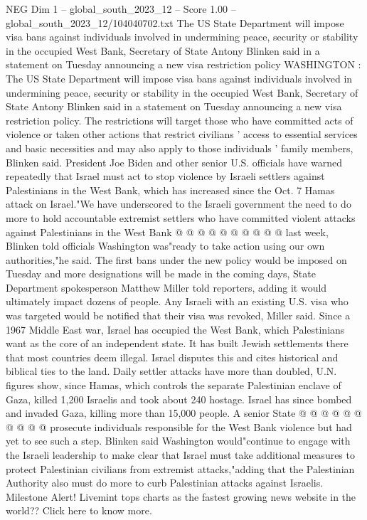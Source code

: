 \begin{textsample}{NEG Dim 1 – global\_south\_2023\_12 – Score 1.00 – global\_south\_2023\_12/104040702.txt}  \label{ex:f1_neg_413}
The US State Department will impose visa bans against individuals involved in undermining peace, security or stability in the occupied West Bank, Secretary of State Antony Blinken said in a statement on Tuesday announcing a new visa restriction policy WASHINGTON : The US State Department will impose visa bans against individuals involved in undermining peace, security or stability in the occupied West Bank, Secretary of State Antony Blinken said in a statement on Tuesday announcing a new visa restriction policy.
The restrictions will target those who have committed acts of violence or taken other actions that restrict civilians ' access to essential services and basic necessities and may also apply to those individuals ' family members, Blinken said.
President Joe Biden and other senior U.S. officials have warned repeatedly that Israel must act to stop violence by Israeli settlers against Palestinians in the West Bank, which has increased since the Oct. 7 Hamas attack on Israel."We have underscored to the Israeli government the need to do more to hold accountable extremist settlers who have committed violent attacks against Palestinians in the West Bank @ @ @ @ @ @ @ @ @ @ last week, Blinken told officials Washington was"ready to take action using our own authorities,"he said.
The first bans under the new policy would be imposed on Tuesday and more designations will be made in the coming days, State Department spokesperson Matthew Miller told reporters, adding it would ultimately impact dozens of people.
Any Israeli with an existing U.S. visa who was targeted would be notified that their visa was revoked, Miller said.
Since a 1967 Middle East war, Israel has occupied the West Bank, which Palestinians want as the core of an independent state.
It has built Jewish settlements there that most countries deem illegal.
Israel disputes this and cites historical and biblical ties to the land.
Daily settler attacks have more than doubled, U.N. figures show, since Hamas, which controls the separate Palestinian enclave of Gaza, killed 1,200 Israelis and took about 240 hostage.
Israel has since bombed and invaded Gaza, killing more than 15,000 people.
A senior State @ @ @ @ @ @ @ @ @ @ prosecute individuals responsible for the West Bank violence but had yet to see such a step.
Blinken said Washington would"continue to engage with the Israeli leadership to make clear that Israel must take additional measures to protect Palestinian civilians from extremist attacks,"adding that the Palestinian Authority also must do more to curb Palestinian attacks against Israelis.
Milestone Alert!
Livemint tops charts as the fastest growing news website in the world??
Click here to know more.

\end{textsample}
